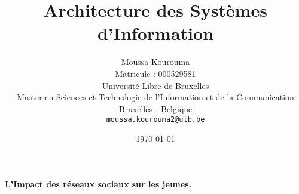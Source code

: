\documentclass[12pt,a4paper,titlepage]{article}
\title{Architecture des Systèmes d'Information {}}
\author{Moussa Kourouma\\
   Matricule : 000529581\\
   Université Libre de Bruxelles\\
   Master en Sciences et Technologie de l'Information et de la Communication\\
   Bruxelles - Belgique\\
   \texttt{moussa.kourouma2@ulb.be}}
\date{\today}
\begin{document}
\maketitle

\clearpage
\vspace*{\fill}
\begin{center}
\begin{minipage}{.6\textwidth}
\begin{center}
\huge {\textbf {L’Impact des réseaux sociaux sur les jeunes.}} 
\end{center}
\end{minipage}
\end{center}
\vfill %
\clearpage

\tableofcontents


\newpage
\end{document}
